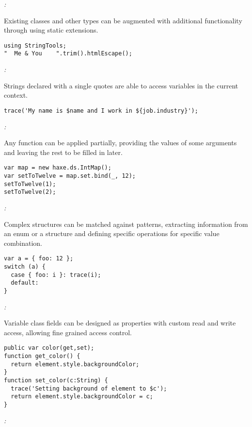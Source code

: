 \emph{:}

Existing classes and other types can be augmented with additional functionality through using static extensions.

\begin{lstlisting}
using StringTools;
"  Me & You    ".trim().htmlEscape();
\end{lstlisting}

\emph{:}

Strings declared with a single quotes are able to access variables in the current context.

\begin{lstlisting}
trace('My name is $name and I work in ${job.industry}');
\end{lstlisting}

\emph{:}

Any function can be applied partially, providing the values of some arguments and leaving the rest to be filled in later.

\begin{lstlisting}
var map = new haxe.ds.IntMap();
var setToTwelve = map.set.bind(_, 12);
setToTwelve(1);
setToTwelve(2);
\end{lstlisting}

\emph{:}

Complex structures can be matched against patterns, extracting information from an enum or a structure and defining specific operations for specific value combination.

\begin{lstlisting}
var a = { foo: 12 };
switch (a) {
  case { foo: i }: trace(i);
  default:
}
\end{lstlisting}

\emph{:}

Variable class fields can be designed as properties with custom read and write access, allowing fine grained access control.
\begin{lstlisting}
public var color(get,set);
function get_color() {
  return element.style.backgroundColor;
}
function set_color(c:String) {
  trace('Setting background of element to $c');
  return element.style.backgroundColor = c;
}
\end{lstlisting}

\emph{:}

